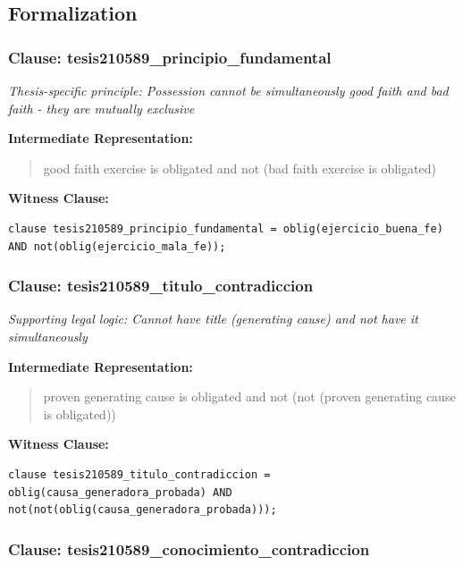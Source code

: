 \documentclass[11pt,a4paper]{article}
\begin{document}
\subsection{Formalization}

\subsubsection{Clause: tesis210589\_principio\_fundamental}

\textit{Thesis-specific principle: Possession cannot be simultaneously good faith and bad faith - they are mutually exclusive}

\textbf{Intermediate Representation:}

\begin{quote}
good faith exercise is obligated and not (bad faith exercise is obligated)
\end{quote}

\textbf{Witness Clause:}

\begin{lstlisting}[style=witnessstyle, language=Witness]
clause tesis210589_principio_fundamental = oblig(ejercicio_buena_fe) AND not(oblig(ejercicio_mala_fe));
\end{lstlisting}

\subsubsection{Clause: tesis210589\_titulo\_contradiccion}

\textit{Supporting legal logic: Cannot have title (generating cause) and not have it simultaneously}

\textbf{Intermediate Representation:}

\begin{quote}
proven generating cause is obligated and not (not (proven generating cause is obligated))
\end{quote}

\textbf{Witness Clause:}

\begin{lstlisting}[style=witnessstyle, language=Witness]
clause tesis210589_titulo_contradiccion = oblig(causa_generadora_probada) AND not(not(oblig(causa_generadora_probada)));
\end{lstlisting}

\subsubsection{Clause: tesis210589\_conocimiento\_contradiccion}
\end{document}
